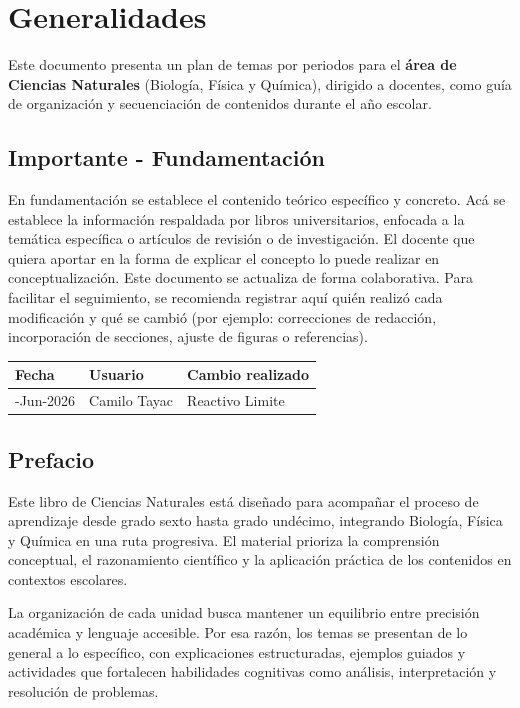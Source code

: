 \documentclass[
  spanish,
  letterpaper,
  12pt,
  oneside,
  open=any]{scrbook}
\newcounter{none} %
\begin{document}
\chapter{Generalidades}\label{generalidades-1}

Este documento presenta un plan de temas por periodos para el
\textbf{área de Ciencias Naturales} (Biología, Física y Química),
dirigido a docentes, como guía de organización y secuenciación de
contenidos durante el año escolar.

\section{Importante -
Fundamentación}\label{importante---fundamentaciuxf3n}

En fundamentación se establece el contenido teórico específico y
concreto. Acá se establece la información respaldada por libros
universitarios, enfocada a la temática específica o artículos de
revisión o de investigación. El docente que quiera aportar en la forma
de explicar el concepto lo puede realizar en conceptualización. Este
documento se actualiza de forma colaborativa. Para facilitar el
seguimiento, se recomienda registrar aquí quién realizó cada
modificación y qué se cambió (por ejemplo: correcciones de redacción,
incorporación de secciones, ajuste de figuras o referencias).

{\def\LTcaptype{none} %
\begin{longtable}[]{@{}lll@{}}
\toprule\noalign{}
Fecha & Usuario & Cambio realizado \\
\midrule\noalign{}
\endhead
\bottomrule\noalign{}
\endlastfoot
8-Jun-2026 & Camilo Tayac & Reactivo Limite \\
\end{longtable}
}

\section{Prefacio}\label{prefacio}

Este libro de Ciencias Naturales está diseñado para acompañar el proceso
de aprendizaje desde grado sexto hasta grado undécimo, integrando
Biología, Física y Química en una ruta progresiva. El material prioriza
la comprensión conceptual, el razonamiento científico y la aplicación
práctica de los contenidos en contextos escolares.

La organización de cada unidad busca mantener un equilibrio entre
precisión académica y lenguaje accesible. Por esa razón, los temas se
presentan de lo general a lo específico, con explicaciones
estructuradas, ejemplos guiados y actividades que fortalecen habilidades
cognitivas como análisis, interpretación y resolución de problemas.
\end{document}
